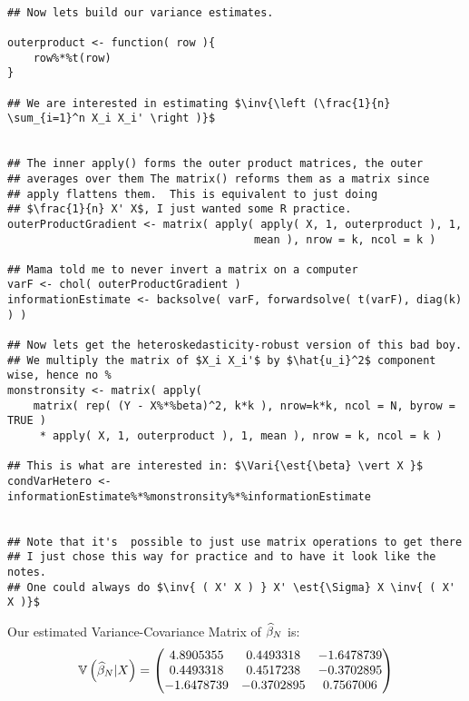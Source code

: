 \documentclass[12pt]{paper}
\begin{document}
\begin{verbatim}

## Now lets build our variance estimates.

outerproduct <- function( row ){
    row%*%t(row)
}

## We are interested in estimating $\inv{\left (\frac{1}{n} \sum_{i=1}^n X_i X_i' \right )}$


## The inner apply() forms the outer product matrices, the outer
## averages over them The matrix() reforms them as a matrix since
## apply flattens them.  This is equivalent to just doing
## $\frac{1}{n} X' X$, I just wanted some R practice.
outerProductGradient <- matrix( apply( apply( X, 1, outerproduct ), 1,
                                      mean ), nrow = k, ncol = k )

## Mama told me to never invert a matrix on a computer
varF <- chol( outerProductGradient )
informationEstimate <- backsolve( varF, forwardsolve( t(varF), diag(k) ) )

## Now lets get the heteroskedasticity-robust version of this bad boy.
## We multiply the matrix of $X_i X_i'$ by $\hat{u_i}^2$ component wise, hence no % 
monstronsity <- matrix( apply(
    matrix( rep( (Y - X%*%beta)^2, k*k ), nrow=k*k, ncol = N, byrow = TRUE )
     * apply( X, 1, outerproduct ), 1, mean ), nrow = k, ncol = k )

## This is what are interested in: $\Vari{\est{\beta} \vert X }$
condVarHetero <- informationEstimate%*%monstronsity%*%informationEstimate


## Note that it's  possible to just use matrix operations to get there
## I just chose this way for practice and to have it look like the notes.
## One could always do $\inv{ ( X' X ) } X' \est{\Sigma} X \inv{ ( X' X )}$

\end{verbatim}

Our estimated Variance-Covariance Matrix of $\widehat{ \beta }_{N}$ is:
\begin{equation*}
  \mathbb{V} \left (  \widehat{ \beta }_{N} \vert X \right ) =
  \begin{pmatrix}
     4.8905355 &  0.4493318 & -1.6478739\\
  0.4493318 &  0.4517238 & -0.3702895\\
 -1.6478739 & -0.3702895 &  0.7567006\\
  \end{pmatrix}
\end{equation*}
\end{document}
